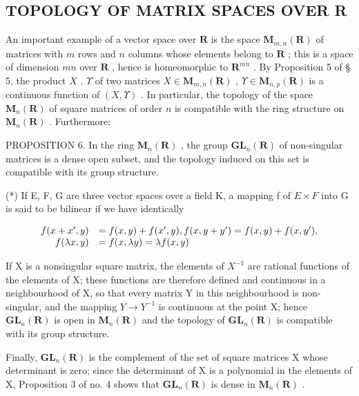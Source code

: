 \subsection{TOPOLOGY OF MATRIX SPACES OVER R}

An important example of a vector space over \(\mathbf{R}\) is the space \(\mathbf{M}_{m,n}(\mathbf{R})\) of matrices with \(m\) rows and \(n\) columns whose elements belong to \(\mathbf{R}\) ; this is a space of dimension \(mn\) over \(\mathbf{R}\) , hence is homeomorphic to \(\mathbf{R}^{mn}\) . By Proposition 5 of § 5, the product \(X\) . \(\Upsilon\) of two matrices \(X \in \mathbf{M}_{m,n}(\mathbf{R})\) , \(\Upsilon \in \mathbf{M}_{n,p}(\mathbf{R})\) is a continuous function of \((X, \Upsilon)\) . In particular, the topology of the space \(\mathbf{M}_n(\mathbf{R})\) of square matrices of order \(n\) is compatible with the ring structure on \(\mathbf{M}_n(\mathbf{R})\) . Furthermore:

PROPOSITION 6. In the ring \(\mathbf{M}_n(\mathbf{R})\) , the group \(\mathbf{GL}_n(\mathbf{R})\) of non-singular matrices is a dense open subset, and the topology induced on this set is compatible with its group structure.

(*) If E, F, G are three vector spaces over a field K, a mapping f of \(E \times F\) into G is said to be bilinear if we have identically

\[
\begin{array}{r l} f (x + x ^ {\prime}, y) & = f (x, y) + f (x ^ {\prime}, y), f (x, y + y ^ {\prime}) = f (x, y) + f (x, y ^ {\prime}), \\ f (\lambda x, y) & = f (x, \lambda y) = \lambda f (x, y) \end{array}
\]

If X is a nonsingular square matrix, the elements of \(X^{-1}\) are rational functions of the elements of X; these functions are therefore defined and continuous in a neighbourhood of X, so that every matrix Y in this neighbourhood is non-singular, and the mapping \(Y \to Y^{-1}\) is continuous at the point X; hence \(\mathbf{GL}_{n}(\mathbf{R})\) is open in \(\mathbf{M}_{n}(\mathbf{R})\) and the topology of \(\mathbf{GL}_{n}(\mathbf{R})\) is compatible with its group structure.

Finally, \(\mathbf{GL}_{n}(\mathbf{R})\) is the complement of the set of square matrices X whose determinant is zero; since the determinant of X is a polynomial in the elements of X, Proposition 3 of no. 4 shows that \(\mathbf{GL}_{n}(\mathbf{R})\) is dense in \(\mathbf{M}_{n}(\mathbf{R})\) .

